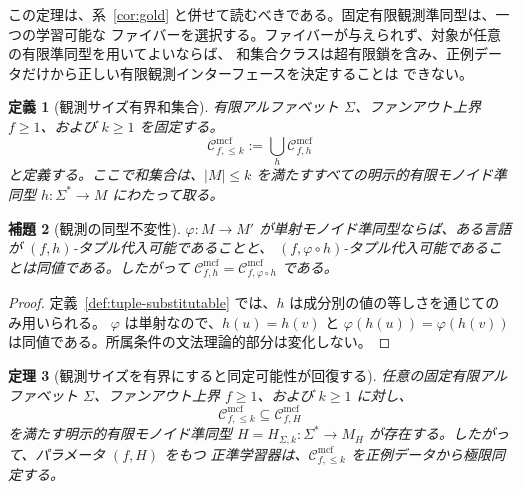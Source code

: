 \documentclass[11pt,a4paper]{ltjsarticle}
\newtheorem{theorem}{定理}[section]
\newtheorem{lemma}[theorem]{補題}
\newtheorem{definition}[theorem]{定義}
\theoremstyle{remark}
\newcommand{\Cmcf}[2]{\mathcal{C}^{\mathrm{mcf}}_{#1,#2}}
\begin{document}
この定理は、系~\ref{cor:gold} と併せて読むべきである。固定有限観測準同型は、一つの学習可能な
ファイバーを選択する。ファイバーが与えられず、対象が任意の有限準同型を用いてよいならば、
和集合クラスは超有限鎖を含み、正例データだけから正しい有限観測インターフェースを決定することは
できない。

\begin{definition}[観測サイズ有界和集合]
\label{def:bounded-observation-union}
有限アルファベット \(\Sigma\)、ファンアウト上界 \(f\ge1\)、および \(k\ge1\) を固定する。
\[
  \Cmcf{f}{\le k}:=\bigcup_h \Cmcf{f}{h}
\]
と定義する。ここで和集合は、\(|M|\le k\) を満たすすべての明示的有限モノイド準同型
\(h:\Sigma^*\to M\) にわたって取る。
\end{definition}

\begin{lemma}[観測の同型不変性]
\label{lem:iso-invariance}
\(\varphi:M\to M'\) が単射モノイド準同型ならば、ある言語が \((f,h)\)-タプル代入可能であることと、
\((f,\varphi\circ h)\)-タプル代入可能であることは同値である。したがって
\(\Cmcf{f}{h}=\Cmcf{f}{\varphi\circ h}\) である。
\end{lemma}

\begin{proof}
定義~\ref{def:tuple-substitutable} では、\(h\) は成分別の値の等しさを通じてのみ用いられる。
\(\varphi\) は単射なので、\(h(u)=h(v)\) と
\(\varphi(h(u))=\varphi(h(v))\) は同値である。所属条件の文法理論的部分は変化しない。
\end{proof}

\begin{theorem}[観測サイズを有界にすると同定可能性が回復する]
\label{thm:bounded-union-identifiable}
任意の固定有限アルファベット \(\Sigma\)、ファンアウト上界 \(f\ge1\)、および \(k\ge1\) に対し、
\[
  \Cmcf{f}{\le k}\subseteq\Cmcf{f}{H}
\]
を満たす明示的有限モノイド準同型
\(H=H_{\Sigma,k}:\Sigma^*\to M_H\) が存在する。したがって、パラメータ \((f,H)\) をもつ
正準学習器は、\(\Cmcf{f}{\le k}\) を正例データから極限同定する。
\end{theorem}
\end{document}
